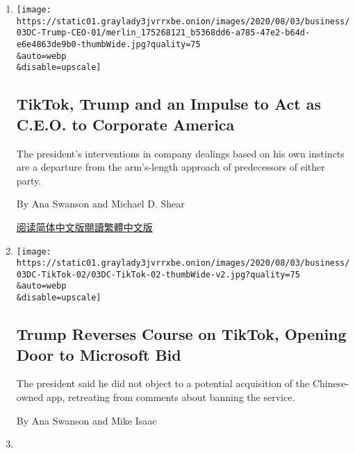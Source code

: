 \begin{enumerate}
\def\labelenumi{\arabic{enumi}.}
\item
  \href{/2020/08/03/business/economy/trump-tiktok-china-business.html}{}

  \texttt{[image: https://static01.graylady3jvrrxbe.onion/images/2020/08/03/business/03DC-Trump-CEO-01/merlin\_175268121\_b5368dd6-a785-47e2-b64d-e6e4863de9b0-thumbWide.jpg?quality=75\\\&auto=webp\\\&disable=upscale]}

  \hypertarget{tiktok-trump-and-an-impulse-to-act-as-ceo-to-corporate-america}{%
  \subsection{TikTok, Trump and an Impulse to Act as C.E.O. to Corporate
  America}\label{tiktok-trump-and-an-impulse-to-act-as-ceo-to-corporate-america}}

  The president's interventions in company dealings based on his own
  instincts are a departure from the arm's-length approach of
  predecessors of either party.

  By Ana Swanson and Michael D. Shear

  \href{https://cn.nytimes3xbfgragh.onion/business/20200804/trump-tiktok-china-business/}{阅读简体中文版}\href{https://cn.nytimes3xbfgragh.onion/business/20200804/trump-tiktok-china-business/zh-hant/}{閱讀繁體中文版}
\item
  \href{/2020/08/03/technology/trump-tiktok-microsoft.html}{}

  \texttt{[image: https://static01.graylady3jvrrxbe.onion/images/2020/08/03/business/03DC-TikTok-02/03DC-TikTok-02-thumbWide-v2.jpg?quality=75\\\&auto=webp\\\&disable=upscale]}

  \hypertarget{trump-reverses-course-on-tiktok-opening-door-to-microsoft-bid}{%
  \subsection{Trump Reverses Course on TikTok, Opening Door to Microsoft
  Bid}\label{trump-reverses-course-on-tiktok-opening-door-to-microsoft-bid}}

  The president said he did not object to a potential acquisition of the
  Chinese-owned app, retreating from comments about banning the service.

  By Ana Swanson and Mike Isaac
\item
  \href{/2020/08/02/business/economy/trump-tiktok-china-national-security.html}{}


\end{enumerate}
